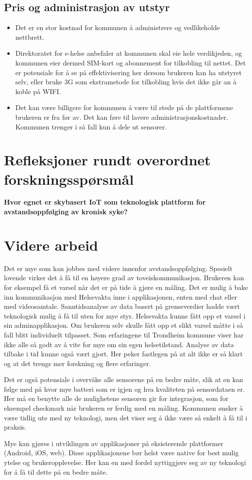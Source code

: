 \subsection{Pris og administrasjon av utstyr}
\begin{itemize}
    \item Det er en stor kostnad for kommunen å administrere og vedlikeholde nettbrett.
    \item Direktoratet for e-helse anbefaler at kommunen skal eie hele verdikjeden, og kommunen eier
        dermed SIM-kort og abonnement for tilkobling til nettet. Det er potensiale for å se på
        effektivisering her dersom brukeren kan ha utstyret selv, eller bruke 3G som ekstrametode
        for tilkobling hvis det ikke går an å koble på WIFI.
    \item Det kan være billigere for kommunen å være til stede på de plattformene brukeren er fra før av.
        Det kan føre til lavere administrasjonskostnader. Kommunen trenger i så fall kun å dele ut sensorer.
\end{itemize}

\section{Refleksjoner rundt overordnet forskningsspørsmål}
\textbf{Hvor egnet er skybasert IoT som teknologisk plattform for avstandsoppfølging av kronisk syke?}

\section{Videre arbeid}
Det er mye som kan jobbes med videre innenfor avstandsoppfølging. Spesielt lovende virker det å få til
en høyere grad av toveiskommunikasjon. Brukeren kan for eksempel få et varsel når det er på tide å gjøre en måling.
Det er mulig å bake inn kommunikasjon med Helsevakta inne i applikasjonen, enten med chat eller med videosamtale.
Sanntidsanalyse av data basert på grenseverdier hadde vært teknologisk mulig å få til uten for mye styr. Helsevakta
kunne fått opp et varsel i sin adminapplikasjon. Om brukeren selv skulle fått opp et slikt varsel måtte i så fall blitt
individuelt tilpasset. Som erfaringene til Trondheim kommune viser har ikke alle så godt av å vite for mye om sin egen
helsetilstand. Analyse av data tilbake i tid kunne også vært gjort. Her peker fastlegen på at alt ikke er så klart og
at det trengs mer forskning og flere erfaringer.

Det er også potensiale i overvåke alle sensorene på en bedre måte, slik at en kan følge med på hvor mye batteri som er igjen
og hva kvaliteten på sensordataen er. Her må en benytte alle de mulighetene sensoren gir for integrasjon, som for eksempel
checkmark når brukeren er ferdig med en måling. Kommunen ønsker å være tidlig ute med
ny teknologi, men det viser seg å ikke være så enkelt å få til i praksis.

Mye kan gjøres i utviklingen av applikasjoner på eksisterende plattformer (Android, iOS, web). Disse applikasjonene bør helst være native for best
mulig ytelse og brukeropplevelse. Her kan en med fordel nyttiggjøre seg av ny teknologi for å få til dette på en bedre måte.
